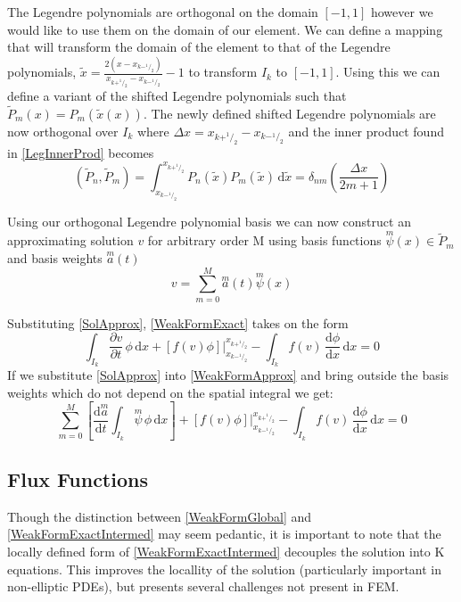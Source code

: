 \documentclass[letterpaper]{article}
\begin{document}
The Legendre polynomials are orthogonal on the domain $[-1,1]$ however we would like to use them on the domain of our element. We can define a mapping that will transform the domain of the element to that of the Legendre polynomials, $\tilde{x} = \frac{2(x-x_{k-^1\!/_2})}{x_{k+^1\!/_2}-x_{k-^1\!/_2}}-1$ to transform $I_k$ to $[-1,1]$. Using this we can define a variant of the shifted Legendre polynomials such that $\tilde{P}_m(x) = P_m(\tilde{x}(x))$. The newly defined shifted Legendre polynomials are now orthogonal over $I_k$ where $\Delta x = x_{k+^1\!/_2}-x_{k-^1\!/_2}$ and the inner product found in \eqref{LegInnerProd} becomes
	\begin{equation}\label{ShiftLegInnerProd}
	(\tilde{P}_n,\tilde{P}_m) = \int_{x_{k-^1\!/_2}}^{x_{k+^1\!/_2}} \! P_n(\tilde{x}) P_m(\tilde{x}) \, \mathrm{d}\tilde{x} = \delta_{nm} \left(\frac{\Delta x}{2m+1}\right)
	\end{equation}

Using our orthogonal Legendre polynomial basis we can now construct an approximating solution $v$ for arbitrary order M using basis functions $\overset{m}{\psi}(x) \in \tilde{P}_m$ and basis weights $\overset{m}{a}(t)$
	\begin{equation}\label{SolApprox}
	v = \sum_{m=0}^M \overset{m}{a}(t)\overset{m}{\psi}(x)
	\end{equation}


Substituting \eqref{SolApprox}, \eqref{WeakFormExact} takes on the form
	\begin{equation}\label{WeakFormApprox}
	\int_{I_k}\! \frac{\partial v}{\partial t} \,\phi \,\mathrm{d}x +
	[f(v)\phi] \Big\rvert_{x_{k-^1\!/_2}}^{x_{k+^1\!/_2}} -
	\int_{I_k}\! f(v) \,\frac{\mathrm{d} \phi}{\mathrm{d} x} \,\mathrm{d}x = 0
	\end{equation}
If we substitute \eqref{SolApprox} into \eqref{WeakFormApprox} and bring outside the basis weights which do not depend on the spatial integral we get:
	\begin{equation}\label{WeakFormApproxIntermed}
	\sum_{m=0}^M \left[ \frac{\mathrm{d}\overset{m}{a}}{\mathrm{d} t} \int_{I_k}\! \overset{m}{\psi} \,\phi \,\mathrm{d}x \right] + 
	[f(v)\phi] \Big\rvert_{x_{k-^1\!/_2}}^{x_{k+^1\!/_2}} -
	 \int_{I_k}\! f(v) \,\frac{\mathrm{d} \phi}{\mathrm{d} x} \,\mathrm{d}x = 0
	\end{equation}

\subsection{Flux Functions}
Though the distinction between \eqref{WeakFormGlobal} and \eqref{WeakFormExactIntermed} may seem pedantic, it is important to note that the locally defined form of \eqref{WeakFormExactIntermed} decouples the solution into K equations. This improves the locallity of the solution (particularly important in non-elliptic PDEs), but presents several challenges not present in FEM.
\end{document}
